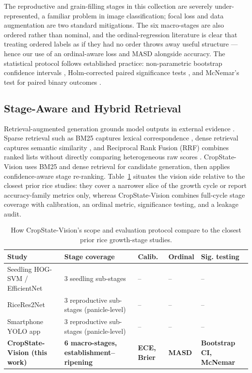 \documentclass[conference]{IEEEtran}
\begin{document}
The reproductive and grain-filling stages in this collection are severely under-represented, a familiar problem in image classification; focal loss \cite{lin2017focal} and data augmentation \cite{shorten2019survey} are two standard mitigations. The six macro-stages are also ordered rather than nominal, and the ordinal-regression literature is clear that treating ordered labels as if they had no order throws away useful structure \cite{gutierrez2016ordinal}---hence our use of an ordinal-aware loss and MASD alongside accuracy. The statistical protocol follows established practice: non-parametric bootstrap confidence intervals \cite{efron1993bootstrap}, Holm-corrected paired significance tests \cite{holm1979sequential}, and McNemar's test for paired binary outcomes \cite{mcnemar1947note}.

\subsection{Stage-Aware and Hybrid Retrieval}

Retrieval-augmented generation grounds model outputs in external evidence \cite{lewis2020rag}. Sparse retrieval such as BM25 captures lexical correspondence \cite{robertson2009bm25}, dense retrieval captures semantic similarity \cite{karpukhin2020dpr}, and Reciprocal Rank Fusion (RRF) combines ranked lists without directly comparing heterogeneous raw scores \cite{cormack2009rrf}. CropState-Vision uses BM25 and dense retrieval for candidate generation, then applies confidence-aware stage re-ranking. Table~\ref{tab:positioning} situates the vision side relative to the closest prior rice studies: they cover a narrower slice of the growth cycle or report accuracy-family metrics only, whereas CropState-Vision combines full-cycle stage coverage with calibration, an ordinal metric, significance testing, and a leakage audit.

\begin{table}[t]
\centering
\caption{How CropState-Vision's scope and evaluation protocol compare to the closest prior rice growth-stage studies.}
\label{tab:positioning}
\small
\begin{tabular}{p{}p{}>{\centering\arraybackslash}p{}>{\centering\arraybackslash}p{}p{}}
\toprule
\textbf{Study} & \textbf{Stage coverage} & \textbf{Calib.} & \textbf{Ordinal} & \textbf{Sig. testing} \\
\midrule
Seedling HOG-SVM / EfficientNet \cite{tan2022machine} & 3 seedling sub-stages & -- & -- & -- \\
RiceRes2Net \cite{tan2023ricepanicle} & 3 reproductive sub-stages (panicle-level) & -- & -- & -- \\
Smartphone YOLO app \cite{zheng2025android} & 3 reproductive sub-stages (panicle-level) & -- & -- & -- \\
\textbf{CropState-Vision (this work)} & \textbf{6 macro-stages, establishment--ripening} & \textbf{ECE, Brier} & \textbf{MASD} & \textbf{Bootstrap CI, McNemar} \\
\bottomrule
\end{tabular}
\end{table}
\end{document}
